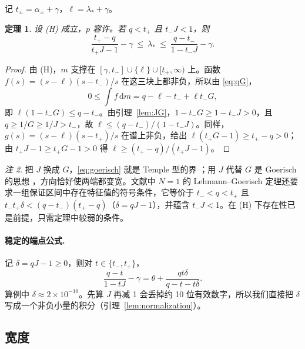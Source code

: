 \documentclass[11pt,a4paper,fontset=fandol]{ctexart}
\newcommand{\dd}{\mathrm{d}}
\theoremstyle{plain}
\newtheorem{theorem}{定理}[section]
\theoremstyle{definition}
\theoremstyle{remark}
\newtheorem{remark}[theorem]{注}
\begin{document}
记 $t_\pm=\alpha_\pm+\gamma$，$\ell=\lambda_*+\gamma$。

\begin{theorem}
\label{thm:goerisch}
设 (H) 成立，$p$ 容许。若 $q<t_+$ 且 $t_-J<1$，则
\begin{equation}
\label{eq:goerisch}
\frac{t_+-q}{t_+J-1}-\gamma\ \le\ \lambda_*\ \le\ \frac{q-t_-}{1-t_-J}-\gamma .
\end{equation}
\end{theorem}

\begin{proof}
由 (H)，$m$ 支撑在 $[\gamma,t_-]\cup\{\ell\}\cup[t_+,\infty)$ 上。函数 $f(s)=(s-\ell)(s-t_-)/s$ 在这三块上都非负，所以由 \eqref{eq:qG}，
\[
0\le\int f\,\dd m=q-\ell-t_-+\ell t_-G ,
\]
即 $\ell(1-t_-G)\le q-t_-$。由引理~\ref{lem:JG}，$1-t_-G\ge1-t_-J>0$，且 $q\ge1/G\ge1/J>t_-$，故 $\ell\le(q-t_-)/(1-t_-J)$。同样，$g(s)=(s-\ell)(s-t_+)/s$ 在谱上非负，给出 $\ell(t_+G-1)\ge t_+-q>0$；由 $t_+J-1\ge t_+G-1>0$ 得 $\ell\ge(t_+-q)/(t_+J-1)$。
\end{proof}

\begin{remark}
把 $J$ 换成 $G$，\eqref{eq:goerisch} 就是 Temple 型的界 \cite{Temple1928}；用 $J$ 代替 $G$ 是 Goerisch 的思想 \cite{NakaoPlumWatanabe2019}，方向恰好使两端都变宽。文献中 $N=1$ 的 Lehmann--Goerisch 定理还要求一组保证区间中存在特征值的符号条件，它等价于 $t_-<q<t_+$ 且 $t_-t_+\delta<(q-t_-)(t_+-q)$（$\delta=qJ-1$），并蕴含 $t_-J<1$。在 (H) 下存在性已是前提，只需定理中较弱的条件。
\end{remark}

\paragraph{稳定的端点公式.} 记 $\delta=qJ-1\ge0$，则对 $t\in\{t_-,t_+\}$，
\begin{equation}
\label{eq:endpoint}
\frac{q-t}{1-tJ}-\gamma=\theta+\frac{qt\delta}{q-t-t\delta}.
\end{equation}
算例中 $\delta\approx2\times10^{-10}$。先算 $J$ 再减 1 会丢掉约 10 位有效数字，所以我们直接把 $\delta$ 写成一个非负小量的积分（引理~\ref{lem:normalization}）。

\subsection{宽度}
\end{document}
